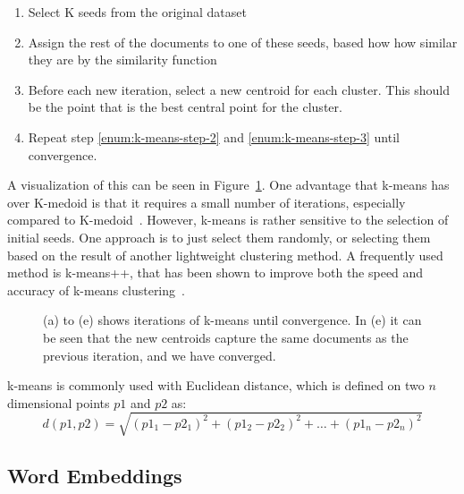 \begin{enumerate}
    \item Select K seeds from the original dataset
    \item \label{enum:k-means-step-2} Assign the rest of the documents to one of these seeds, based how how similar they are by the similarity function
    \item \label{enum:k-means-step-3} Before each new iteration, select a new centroid for each cluster. This should be the point that is the best central point for the cluster.
    \item Repeat step \ref{enum:k-means-step-2} and \ref{enum:k-means-step-3} until convergence.
\end{enumerate}

A visualization of this can be seen in Figure~\ref{fig:kmeans-iterations}.
One advantage that k-means has over K-medoid is that it requires a small number of iterations, especially compared to K-medoid~\cite{aggarwal2012survey, schutze1997projections}.
However, k-means is rather sensitive to the selection of initial seeds.
One approach is to just select them randomly, or selecting them based on the result of another lightweight clustering method.
A frequently used method is k-means++, that has been shown to improve both the speed and accuracy of k-means clustering~\cite{arthur2007k}.

\begin{figure}[h!]
    \centering
    \quad
    \caption{(a) to (e) shows iterations of k-means until convergence.
        In (e) it can be seen that the new centroids capture the same documents as the previous iteration, and we have converged.}
    \label{fig:kmeans-iterations}
\end{figure}

k-means is commonly used with Euclidean distance, which is defined on two $n$ dimensional points $p1$ and $p2$ as:
\begin{equation}
    d(p1, p2) = \sqrt{(p1_1 - p2_1)^2 + (p1_2 - p2_2)^2 + \hdots + (p1_n - p2_n)^2}
\end{equation}

\subsection{Word Embeddings}

